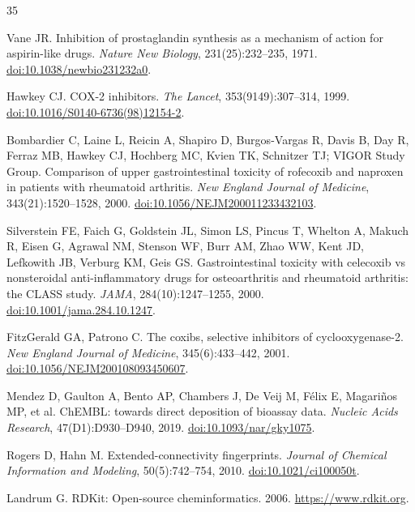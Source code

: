 \documentclass[11pt]{article}
\begin{document}
\begin{thebibliography}{35}

Vane JR.
Inhibition of prostaglandin synthesis as a mechanism of action for aspirin-like drugs.
\textit{Nature New Biology}, 231(25):232--235, 1971.
\href{https://doi.org/10.1038/newbio231232a0}{doi:10.1038/newbio231232a0}.

Hawkey CJ.
COX-2 inhibitors.
\textit{The Lancet}, 353(9149):307--314, 1999.
\href{https://doi.org/10.1016/S0140-6736(98)12154-2}{doi:10.1016/S0140-6736(98)12154-2}.

Bombardier C, Laine L, Reicin A, Shapiro D, Burgos-Vargas R, Davis B, Day R, Ferraz MB, Hawkey CJ, Hochberg MC, Kvien TK, Schnitzer TJ; VIGOR Study Group.
Comparison of upper gastrointestinal toxicity of rofecoxib and naproxen in patients with rheumatoid arthritis.
\textit{New England Journal of Medicine}, 343(21):1520--1528, 2000.
\href{https://doi.org/10.1056/NEJM200011233432103}{doi:10.1056/NEJM200011233432103}.

Silverstein FE, Faich G, Goldstein JL, Simon LS, Pincus T, Whelton A, Makuch R, Eisen G, Agrawal NM, Stenson WF, Burr AM, Zhao WW, Kent JD, Lefkowith JB, Verburg KM, Geis GS.
Gastrointestinal toxicity with celecoxib vs nonsteroidal anti-inflammatory drugs for osteoarthritis and rheumatoid arthritis: the CLASS study.
\textit{JAMA}, 284(10):1247--1255, 2000.
\href{https://doi.org/10.1001/jama.284.10.1247}{doi:10.1001/jama.284.10.1247}.

FitzGerald GA, Patrono C.
The coxibs, selective inhibitors of cyclooxygenase-2.
\textit{New England Journal of Medicine}, 345(6):433--442, 2001.
\href{https://doi.org/10.1056/NEJM200108093450607}{doi:10.1056/NEJM200108093450607}.

Mendez D, Gaulton A, Bento AP, Chambers J, De Veij M, F\'elix E, Magari\~nos MP, et al.
ChEMBL: towards direct deposition of bioassay data.
\textit{Nucleic Acids Research}, 47(D1):D930--D940, 2019.
\href{https://doi.org/10.1093/nar/gky1075}{doi:10.1093/nar/gky1075}.

Rogers D, Hahn M.
Extended-connectivity fingerprints.
\textit{Journal of Chemical Information and Modeling}, 50(5):742--754, 2010.
\href{https://doi.org/10.1021/ci100050t}{doi:10.1021/ci100050t}.

Landrum G.
RDKit: Open-source cheminformatics.
2006. \url{https://www.rdkit.org}.


\end{thebibliography}
\end{document}

